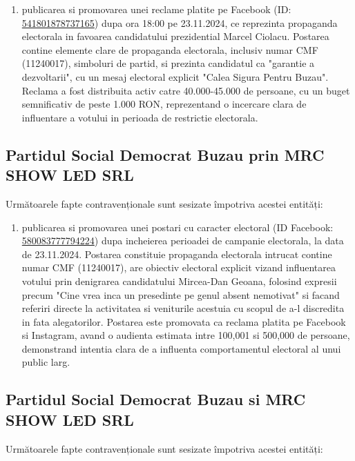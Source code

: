 \documentclass[a4paper,12pt]{article}
\begin{document}
\begin{enumerate}[leftmargin=*, label=\arabic*.)]
    \item publicarea si promovarea unei reclame platite pe Facebook (ID: \href{https://www.facebook.com/ads/library/?id=541801878737165}{541801878737165}) dupa ora 18:00 pe 23.11.2024, ce reprezinta propaganda electorala in favoarea candidatului prezidential Marcel Ciolacu. Postarea contine elemente clare de propaganda electorala, inclusiv numar CMF (11240017), simboluri de partid, si prezinta candidatul ca "garantie a dezvoltarii", cu un mesaj electoral explicit "Calea Sigura Pentru Buzau". Reclama a fost distribuita activ catre 40.000-45.000 de persoane, cu un buget semnificativ de peste 1.000 RON, reprezentand o incercare clara de influentare a votului in perioada de restrictie electorala.
\end{enumerate}

\vspace{0.5cm}

\subsection{Partidul Social Democrat Buzau prin MRC SHOW LED SRL}
Următoarele fapte contravenționale sunt sesizate împotriva acestei entități:

\begin{enumerate}[leftmargin=*, label=\arabic*.)]
    \item publicarea si promovarea unei postari cu caracter electoral (ID Facebook: \href{https://www.facebook.com/ads/library/?id=580083777794224}{580083777794224}) dupa incheierea perioadei de campanie electorala, la data de 23.11.2024. Postarea constituie propaganda electorala intrucat contine numar CMF (11240017), are obiectiv electoral explicit vizand influentarea votului prin denigrarea candidatului Mircea-Dan Geoana, folosind expresii precum "Cine vrea inca un presedinte pe genul absent nemotivat" si facand referiri directe la activitatea si veniturile acestuia cu scopul de a-l discredita in fata alegatorilor. Postarea este promovata ca reclama platita pe Facebook si Instagram, avand o audienta estimata intre 100,001 si 500,000 de persoane, demonstrand intentia clara de a influenta comportamentul electoral al unui public larg.
\end{enumerate}

\vspace{0.5cm}

\subsection{Partidul Social Democrat Buzau si MRC SHOW LED SRL}
Următoarele fapte contravenționale sunt sesizate împotriva acestei entități:
\end{document}
